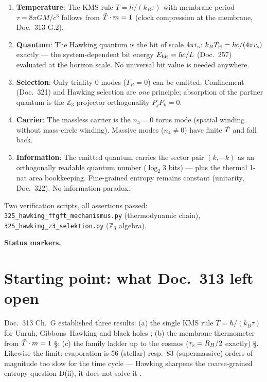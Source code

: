 \begin{enumerate}
  \item \textbf{Temperature}: The KMS rule $T = \hbar/(k_B\tau)$ with
    membrane period $\tau = 8\pi GM/c^3$ follows from $\tilde{T}\cdot m = 1$
    (clock compression at the membrane, Doc.\ 313 G.2). \K
  \item \textbf{Quantum}: The Hawking quantum is the bit of scale $4\pi r_{\mathrm{s}}$:
    $k_BT_{\mathrm{H}} = \hbar c/(4\pi r_{\mathrm{s}})$ exactly — the system-dependent bit energy
    $E_{\mathrm{bit}} = \hbar c/L$ (Doc.\ 257) evaluated at the horizon scale.
    No universal bit value is needed anywhere. \K
  \item \textbf{Selection}: Only triality-0 modes ($T_R = 0$) can be
    emitted. Confinement (Doc.\ 321) and Hawking selection are
    \emph{one} principle; absorption of the partner quantum is the
    $\mathbb{Z}_3$ projector orthogonality $P_jP_k = 0$. \B
  \item \textbf{Carrier}: The massless carrier is the $n_4 = 0$ torus mode
    (spatial winding without mass-circle winding). Massive modes
    ($n_4 \neq 0$) have finite $\tilde{T}$ and fall back. \K
  \item \textbf{Information}: The emitted quantum carries the sector pair
    $(k, -k)$ as an orthogonally readable quantum number ($\log_2 3$ bits) —
    plus the thermal 1-nat area bookkeeping. Fine-grained entropy remains
    constant (unitarity, Doc.\ 322). No information paradox. \K
\end{enumerate}

Two verification scripts, all assertions passed:
\texttt{325\_hawking\_ffgft\_mechanismus.py} (thermodynamic chain),
\texttt{325\_hawking\_z3\_selektion.py} ($\mathbb{Z}_3$ algebra).

\medskip\noindent\textbf{Status markers.}


\section{Starting point: what Doc.\ 313 left open}

Doc.\ 313 Ch.\ G established three results: (a) the single KMS rule
$T = \hbar/(k_B\tau)$ for Unruh, Gibbons--Hawking and black holes \K;
(b) the membrane thermometer from $\tilde{T}\cdot m = 1$ \S; (c) the
family ladder up to the cosmos ($r_{\mathrm{s}} = R_H/2$ exactly) \S. Likewise
the limit: evaporation is 56 (stellar) resp.\ 83 (supermassive) orders
of magnitude too slow for the time cycle — Hawking sharpens the
coarse-grained entropy question D(ii), it does not solve it \K.

